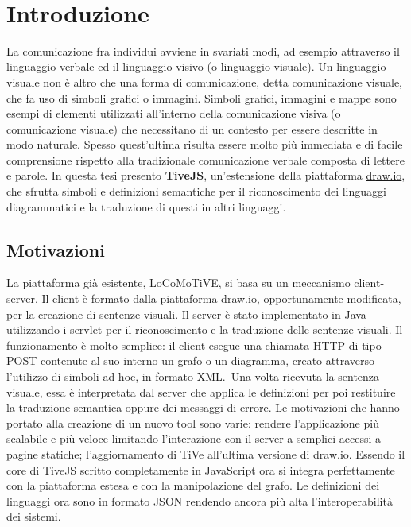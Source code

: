 ﻿﻿\chapter{Introduzione}

    La comunicazione fra individui avviene in svariati modi, ad esempio attraverso il linguaggio verbale ed il linguaggio visivo (o linguaggio visuale).
    \newline
    Un linguaggio visuale non è altro che una forma di comunicazione, detta comunicazione visuale, che fa uso di simboli grafici o immagini. Simboli grafici, immagini e mappe sono esempi di elementi utilizzati all'interno della comunicazione visiva (o comunicazione visuale) che necessitano di un contesto per essere descritte in modo naturale. Spesso quest'ultima risulta essere molto più immediata e di facile comprensione rispetto alla tradizionale comunicazione verbale composta di lettere e parole.
    \newline
    In questa tesi presento \textbf{TiveJS}, un'estensione della piattaforma \href{https://www.draw.io/}{draw.io}, che sfrutta  simboli e  definizioni semantiche per il riconoscimento dei linguaggi diagrammatici e la traduzione di questi in altri linguaggi.

    \section{Motivazioni}
        La piattaforma già esistente, LoCoMoTiVE, si basa su un meccanismo client-server.
        \newline
        Il client è formato dalla piattaforma draw.io, opportunamente modificata, per la creazione di sentenze visuali.
        Il server è stato implementato in Java utilizzando i servlet per il riconoscimento e la traduzione delle sentenze visuali.
        Il funzionamento è molto semplice: il client esegue una chiamata HTTP di tipo POST contenute al suo interno un grafo o un diagramma, creato attraverso l'utilizzo di simboli ad hoc, in formato XML.~Una volta ricevuta la sentenza visuale, essa è interpretata dal server che applica le definizioni per poi restituire la traduzione semantica oppure dei messaggi di errore.
        \newline
        Le motivazioni che hanno portato alla creazione di un nuovo tool sono varie: rendere l'applicazione più scalabile e più veloce limitando l'interazione con il server a semplici accessi a pagine statiche; l'aggiornamento di TiVe all'ultima versione di draw.io.
        Essendo il core di TiveJS scritto completamente in JavaScript ora si integra perfettamente con la piattaforma estesa e con la manipolazione del grafo.
        Le definizioni dei linguaggi ora sono in formato JSON rendendo ancora più alta l'interoperabilità dei sistemi. 

